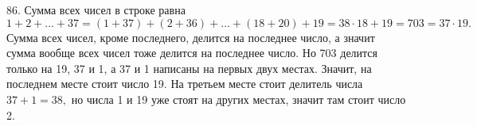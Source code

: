 86. Сумма всех чисел в строке равна $1+2+\ldots+37=(1+37)+(2+36)+\ldots+(18+20)+19=38\cdot18+19=703=37\cdot19.$ Сумма всех чисел, кроме последнего, делится на последнее число, а значит сумма вообще всех чисел тоже делится на последнее число. Но 703 делится только на 19, 37 и 1, а 37 и 1 написаны на первых двух местах. Значит, на последнем месте стоит число 19. На третьем месте стоит делитель числа $37+1=38,$ но числа 1 и 19 уже стоят на других местах, значит там стоит число 2.\\
